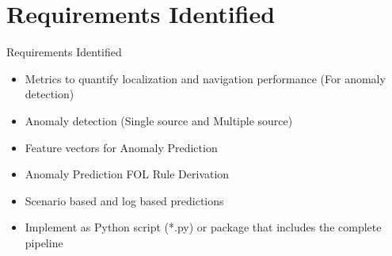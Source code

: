 \documentclass[aspectratio=169, 11pt]{beamer}
\newcommand{\fullsectiontitle}{}
\newcommand{\presentationsection}[2][]{%
  \gdef\fullsectiontitle{#2}%
  \section[#1]{#2}%
}
\begin{document}
\iffalse

\presentationsection[Requirements Identified]{Requirements Identified}

\begin{frame}{Requirements Identified}
  \begin{itemize}
    \item Metrics to quantify localization and navigation performance (For anomaly detection)
    \item Anomaly detection (Single source and Multiple source)
    \item Feature vectors for Anomaly Prediction
    \item Anomaly Prediction FOL Rule Derivation
    \item Scenario based and log based predictions
    \item Implement as Python script (*.py) or package that includes the complete pipeline
  \end{itemize}
\end{frame}
\end{document}
